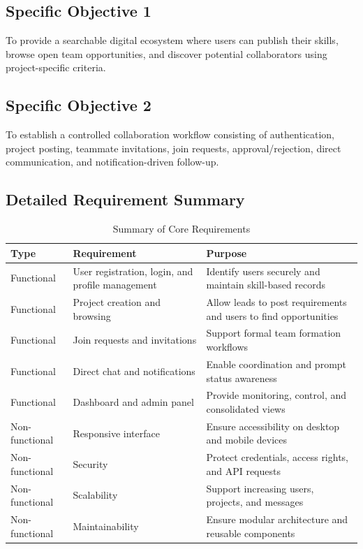 \documentclass[12pt,a4paper,oneside]{report}
\begin{document}
\subsection{Specific Objective 1}
To provide a searchable digital ecosystem where users can publish their skills, browse open team opportunities, and discover potential collaborators using project-specific criteria.

\subsection{Specific Objective 2}
To establish a controlled collaboration workflow consisting of authentication, project posting, teammate invitations, join requests, approval/rejection, direct communication, and notification-driven follow-up.

\subsection{Detailed Requirement Summary}
\begin{table}[H]
\centering
\caption{Summary of Core Requirements}
\begin{tabularx}{\textwidth}{p{1.0in}Y Y}
\toprule
\textbf{Type} & \textbf{Requirement} & \textbf{Purpose} \\
\midrule
Functional & User registration, login, and profile management & Identify users securely and maintain skill-based records \\
Functional & Project creation and browsing & Allow leads to post requirements and users to find opportunities \\
Functional & Join requests and invitations & Support formal team formation workflows \\
Functional & Direct chat and notifications & Enable coordination and prompt status awareness \\
Functional & Dashboard and admin panel & Provide monitoring, control, and consolidated views \\
Non-functional & Responsive interface & Ensure accessibility on desktop and mobile devices \\
Non-functional & Security & Protect credentials, access rights, and API requests \\
Non-functional & Scalability & Support increasing users, projects, and messages \\
Non-functional & Maintainability & Ensure modular architecture and reusable components \\
\bottomrule
\end{tabularx}
\end{table}
\end{document}
